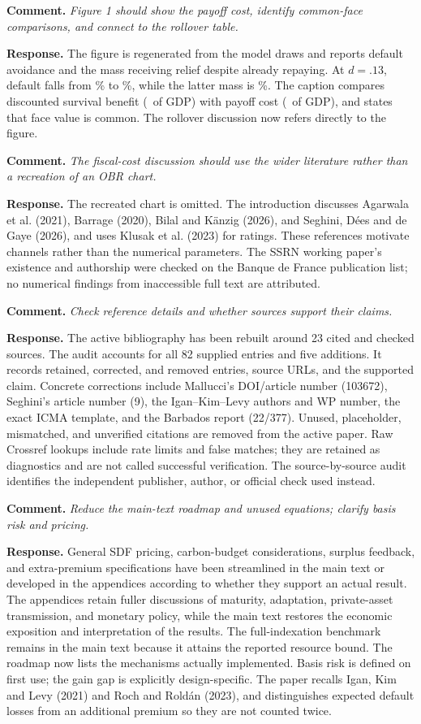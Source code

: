 \documentclass[11pt]{article}
\newcommand{\comment}[1]{\par\medskip\Needspace{7\baselineskip}\noindent\textbf{Comment.} \emph{#1}\par\smallskip}
\newcommand{\response}{\noindent\textbf{Response.} }
\begin{document}
\comment{Figure 1 should show the payoff cost, identify common-face comparisons, and connect to the rollover table.}
\response The figure is regenerated from the model draws and reports default avoidance and the mass receiving relief despite already repaying. At $d=.13$, default falls from \FigDefaultStraight\% to \FigDefaultGdp\%, while the latter mass is \FigPaidInSurvivalMass\%. The caption compares discounted survival benefit (\FigSurvivalPayoffGain\ of GDP) with payoff cost (\FigSurvivalPayoffCost\ of GDP), and states that face value is common. The rollover discussion now refers directly to the figure.

\comment{The fiscal-cost discussion should use the wider literature rather than a recreation of an OBR chart.}
\response The recreated chart is omitted. The introduction discusses Agarwala et al. (2021), Barrage (2020), Bilal and K\"anzig (2026), and Seghini, D\'ees and de Gaye (2026), and uses Klusak et al. (2023) for ratings. These references motivate channels rather than the numerical parameters. The SSRN working paper's existence and authorship were checked on the Banque de France publication list; no numerical findings from inaccessible full text are attributed.

\comment{Check reference details and whether sources support their claims.}
\response The active bibliography has been rebuilt around 23 cited and checked sources. The audit accounts for all 82 supplied entries and five additions. It records retained, corrected, and removed entries, source URLs, and the supported claim. Concrete corrections include Mallucci's DOI/article number (103672), Seghini's article number (9), the Igan--Kim--Levy authors and WP number, the exact ICMA template, and the Barbados report (22/377). Unused, placeholder, mismatched, and unverified citations are removed from the active paper. Raw Crossref lookups include rate limits and false matches; they are retained as diagnostics and are not called successful verification. The source-by-source audit identifies the independent publisher, author, or official check used instead.

\comment{Reduce the main-text roadmap and unused equations; clarify basis risk and pricing.}
\response General SDF pricing, carbon-budget considerations, surplus feedback, and extra-premium specifications have been streamlined in the main text or developed in the appendices according to whether they support an actual result. The appendices retain fuller discussions of maturity, adaptation, private-asset transmission, and monetary policy, while the main text restores the economic exposition and interpretation of the results. The full-indexation benchmark remains in the main text because it attains the reported resource bound. The roadmap now lists the mechanisms actually implemented. Basis risk is defined on first use; the gain gap is explicitly design-specific. The paper recalls Igan, Kim and Levy (2021) and Roch and Rold\'an (2023), and distinguishes expected default losses from an additional premium so they are not counted twice.
\end{document}
